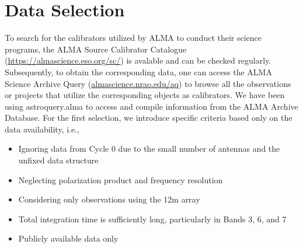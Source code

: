 \section{Data Selection}
To search for the calibrators utilized by ALMA to conduct their science programs, 
the ALMA Source Calibrator Catalogue (\url{https://almascience.eso.org/sc/}) is avalable and can be checked regularly. 
Subsequently, to obtain the corresponding data, one can access the ALMA Science Archive Query (\url{almascience.nrao.edu/aq}) 
to browse all the observations or projects 
that utilize the corresponding objects as calibrators. We have been using \textsf{astroquery.alma} to access and compile 
information from the ALMA Archive Database. 
For the first selection, we introduce specific criteria based only on the data availability, i.e., 
\begin{itemize}
\item Ignoring data from Cycle 0 due to the small number of antennas and the unfixed data structure
\item Neglecting polarization product and frequency resolution
\item Considering only observations using the 12m array 
\item Total integration time is sufficiently long, particularly in Bands 3, 6, and 7 
\item Publicly available data only 
\end{itemize}

